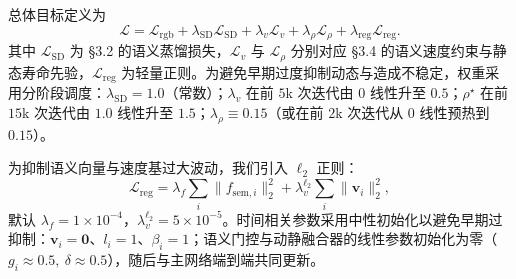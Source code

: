 \documentclass[10pt,conference]{IEEEtran} %
\begin{document}
总体目标定义为
\begin{equation}
\mathcal L=\mathcal L_{\mathrm{rgb}}+\lambda_{\mathrm{SD}}\mathcal L_{\mathrm{SD}}
+\lambda_v \mathcal L_v+\lambda_\rho \mathcal L_\rho+\lambda_{\mathrm{reg}}\mathcal L_{\mathrm{reg}}.
\label{eq:opt_total}
\end{equation}
其中 $\mathcal L_{\mathrm{SD}}$ 为 §3.2 的语义蒸馏损失，$\mathcal L_v$ 与 $\mathcal L_\rho$ 分别对应 §3.4 的语义速度约束与静态寿命先验，$\mathcal L_{\mathrm{reg}}$ 为轻量正则。为避免早期过度抑制动态与造成不稳定，权重采用分阶段调度：$\lambda_{\mathrm{SD}}{=}1.0$（常数）；$\lambda_v$ 在前 $5$k 次迭代由 $0$ 线性升至 $0.5$；$\rho^\star$ 在前 $15$k 次迭代由 $1.0$ 线性升至 $1.5$；$\lambda_\rho\equiv 0.15$（或在前 $2$k 次迭代从 $0$ 线性预热到 $0.15$）。

为抑制语义向量与速度基过大波动，我们引入 $\ell_2$ 正则：
\begin{equation}
\mathcal L_{\mathrm{reg}}=\lambda_f\sum_i \|f_{\mathrm{sem},i}\|_2^2+\lambda_v^{\ell_2}\sum_i \|{\bm v}_i\|_2^2,
\end{equation}
默认 $\lambda_f{=}1\!\times\!10^{-4}$，$\lambda_v^{\ell_2}{=}5\!\times\!10^{-5}$。时间相关参数采用中性初始化以避免早期过抑制：${\bm v}_i{=}\bm{0}$、$l_i{=}1$、$\beta_i{=}1$；语义门控与动静融合器的线性参数初始化为零（$g_i\!\approx\!0.5,\ \delta\!\approx\!0.5$），随后与主网络端到端共同更新。
\end{document}
